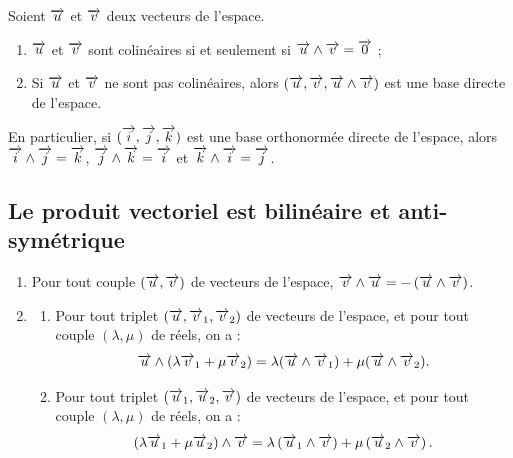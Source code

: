 \documentclass[10pt,oneside]{article}
\begin{document}
\begin{propo}

Soient $\overrightarrow{u}$ et $\overrightarrow{v}$ deux vecteurs de l'espace.
\begin{enumerate}
\item $\overrightarrow{u}$ et $\overrightarrow{v}$ sont colinéaires si et seulement si $\overrightarrow{u}\wedge \overrightarrow{v}=\overrightarrow{0}$ ;
\item Si $\overrightarrow{u}$ et $\overrightarrow{v}$ ne sont pas colinéaires, alors $(\overrightarrow{u}, \overrightarrow{v}, \overrightarrow{u}\wedge\overrightarrow{v})$ est une base directe de l'espace.
\end{enumerate}
\end{propo}

\begin{rem}
En particulier, si $(\overrightarrow{i}, \overrightarrow{j}, \overrightarrow{k})$ est une base orthonormée directe de l'espace, alors $\overrightarrow{i}\wedge\overrightarrow{j}=\overrightarrow{k}$, $\overrightarrow{j} \wedge \overrightarrow{k}=\overrightarrow{i}$ et $\overrightarrow{k}\wedge \overrightarrow{i}=\overrightarrow{j}$.\\

\end{rem}



\subsection{Le produit vectoriel est bilinéaire et anti-symétrique}

\begin{propo}

\begin{enumerate}
\item Pour tout couple $(\overrightarrow{u}, \overrightarrow{v})$ de vecteurs de l'espace, $\overrightarrow{v}\wedge \overrightarrow{u}=-\left(\overrightarrow{u}\wedge\overrightarrow{v}\right)$.
\item \begin{enumerate}
	\item Pour tout triplet $(\overrightarrow{u}, \overrightarrow{v}_1, \overrightarrow{v}_2)$ de vecteurs de l'espace, et pour tout couple $(\lambda, \mu)$ de réels, on a : $$\overrightarrow{u}\wedge(\lambda \overrightarrow{v}_1+\mu \overrightarrow{v}_2)=\lambda (\overrightarrow{u}\wedge\overrightarrow{v}_1)+\mu (\overrightarrow{u}\wedge\overrightarrow{v}_2).$$
	\item Pour tout triplet $(\overrightarrow{u}_1, \overrightarrow{u}_2, \overrightarrow{v})$ de vecteurs de l'espace, et pour tout couple $(\lambda, \mu)$ de réels, on a : $$(\lambda \overrightarrow{u}_1+\mu \overrightarrow{u}_2)\wedge\overrightarrow{v}=\lambda \left(\overrightarrow{u}_1\wedge\overrightarrow{v}\right)+\mu \left(\overrightarrow{u}_2\wedge\overrightarrow{v}\right).$$
	\end{enumerate}
\end{enumerate}
\end{propo}
\end{document}

